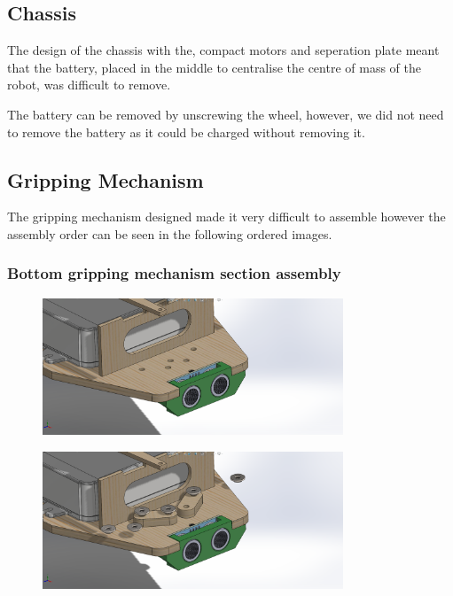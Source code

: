 \documentclass{article}
\begin{document}
\subsection {Chassis}

\quad The design of the chassis with the, compact motors and seperation plate meant that the battery, placed in the middle to centralise the centre of mass of the robot, was difficult to remove.

\quad The battery can be removed by unscrewing the wheel, however, we did not need to remove the battery as it could be charged without removing it.

\subsection{Gripping Mechanism}
\quad The gripping mechanism designed made it very difficult to assemble however the assembly order can be seen in the following ordered images.

\subsubsection{Bottom gripping mechanism section assembly} 

\begin{figure}[H]
    \centering
    \includegraphics[width=0.8\textwidth]{assets/assembly/1.png}
\end{figure}

\begin{figure}[H]
    \centering
    \includegraphics[width=0.8\textwidth]{assets/assembly/2.png}
\end{figure}
\end{document}
